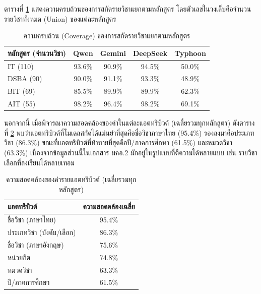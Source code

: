 ตารางที่ \ref{tab:coverage-curriculum} แสดงความครบถ้วนของการสกัดรายวิชาแยกตามหลักสูตร โดยตัวเลขในวงเล็บคือจำนวนรายวิชาทั้งหมด (Union) ของแต่ละหลักสูตร

\begin{table}[ht]
    \centering
    \caption{ความครบถ้วน (Coverage) ของการสกัดรายวิชาแยกตามหลักสูตร}
    \label{tab:coverage-curriculum}
    \begin{tabularx}{\linewidth}{X c c c c}
        \toprule
        \textbf{หลักสูตร (จำนวนวิชา)} & \textbf{Qwen} & \textbf{Gemini} & \textbf{DeepSeek} & \textbf{Typhoon} \\
        \midrule
        IT (110) & 93.6\% & 90.9\% & 94.5\% & 50.0\% \\
        DSBA (90) & 90.0\% & 91.1\% & 93.3\% & 48.9\% \\
        BIT (69) & 85.5\% & 89.9\% & 89.9\% & 62.3\% \\
        AIT (55) & 98.2\% & 96.4\% & 98.2\% & 69.1\% \\
        \bottomrule
    \end{tabularx}
\end{table}

นอกจากนี้ เมื่อพิจารณาความสอดคล้องของค่าในแต่ละแอตทริบิวต์ (เฉลี่ยรวมทุกหลักสูตร) ดังตารางที่ \ref{tab:attr-agreement} พบว่าแอตทริบิวต์ที่โมเดลสกัดได้แม่นยำที่สุดคือชื่อวิชาภาษาไทย (95.4\%) รองลงมาคือประเภทวิชา (86.3\%) ขณะที่แอตทริบิวต์ที่ท้าทายที่สุดคือปี/ภาคการศึกษา (61.5\%) และหมวดวิชา (63.3\%) เนื่องจากข้อมูลส่วนนี้ในเอกสาร มคอ.2 มักอยู่ในรูปแบบที่ตีความได้หลายแบบ เช่น รายวิชาเลือกที่ลงเรียนได้หลายเทอม

\begin{table}[ht]
    \centering
    \caption{ความสอดคล้องของค่ารายแอตทริบิวต์ (เฉลี่ยรวมทุกหลักสูตร)}
    \label{tab:attr-agreement}
    \begin{tabularx}{\linewidth}{X c}
        \toprule
        \textbf{แอตทริบิวต์} & \textbf{ความสอดคล้องเฉลี่ย} \\
        \midrule
        ชื่อวิชา (ภาษาไทย) & 95.4\% \\
        ประเภทวิชา (บังคับ/เลือก) & 86.3\% \\
        ชื่อวิชา (ภาษาอังกฤษ) & 75.6\% \\
        หน่วยกิต & 74.8\% \\
        หมวดวิชา & 63.3\% \\
        ปี/ภาคการศึกษา & 61.5\% \\
        \bottomrule
    \end{tabularx}
\end{table}

